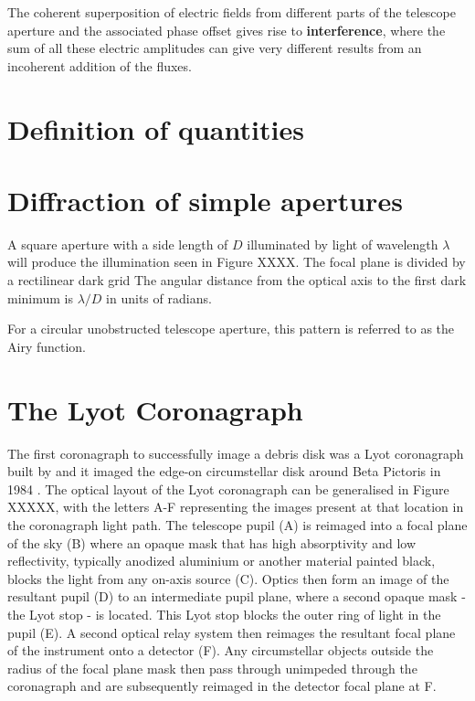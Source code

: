 \documentclass[letterpaper]{ar-1col}
\begin{document}
The coherent superposition of electric fields from different parts of the telescope aperture and the associated phase offset gives rise to \textbf{interference}, where the sum of all these electric amplitudes can give very different results from an incoherent addition of the fluxes.

\section{Definition of quantities}

\section{Diffraction of simple apertures}


A square aperture with a side length of $D$ illuminated by light of wavelength $\lambda$ will produce the illumination seen in Figure XXXX.
%
The focal plane is divided by a rectilinear dark grid
%
The angular distance from the optical axis to the first dark minimum is $\lambda/D$ in units of radians.

For a circular unobstructed telescope aperture, this pattern is referred to as the Airy function.

\section{The Lyot Coronagraph}

The first coronagraph to successfully image a debris disk was a Lyot coronagraph built by \citet{Vilas87} and it imaged the edge-on circumstellar disk around Beta Pictoris in 1984 \citep{Smith84}.
%
The optical layout of the Lyot coronagraph can be generalised in Figure XXXXX, with the letters A-F representing the images present at that location in the coronagraph light path.
%
The telescope pupil (A) is reimaged into a focal plane of the sky (B) where an opaque mask that has high absorptivity and low reflectivity, typically anodized aluminium or another material painted black, blocks the light from any on-axis source (C).
%
Optics then form an image of the resultant pupil (D) to an intermediate pupil plane, where a second opaque mask - the Lyot stop - is located.
%
This Lyot stop blocks the outer ring of light in the pupil (E).
%
A second optical relay system then reimages the resultant focal plane of the instrument onto a detector (F).
%
%
Any circumstellar objects outside the radius of the focal plane mask then pass through unimpeded through the coronagraph and are subsequently reimaged in the detector focal plane at F.
\end{document}
